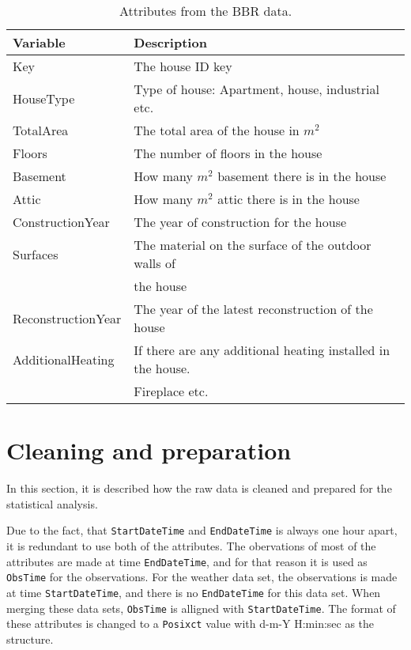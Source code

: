 \begin{table}[h]
    \centering
    \begin{tabular}{ll}
     \hline
     \textbf{Variable} & \textbf{Description} \\
    \hline
    \hline
    Key  &  The house ID key\\
    HouseType  &  Type of house: Apartment, house, industrial etc. \\
    TotalArea  & The total area of the house in $m^2$ \\
    Floors  & The number of floors in the house \\
    Basement  & How many $m^2$ basement there is in the house \\
    Attic  & How many $m^2$ attic there is in the house \\
    ConstructionYear  & The year of construction for the house  \\
    Surfaces  & The material on the surface of the outdoor walls of \\ & the house \\
    ReconstructionYear  & The year of the latest reconstruction of the house \\
    AdditionalHeating  & If there are any additional heating installed in the house. \\ & Fireplace etc. \\
    \hline
    \end{tabular}
    \caption{Attributes from the BBR data.}
    \label{tab: BBR}
\end{table}

\section{Cleaning and preparation}
In this section, it is described how the raw data is cleaned and prepared for the statistical analysis.

\noindent Due to the fact, that \texttt{StartDateTime} and \texttt{EndDateTime} is always one hour apart, it is redundant to use both of the attributes. The obervations of most of the attributes are made at time \texttt{EndDateTime}, and for that reason it is used as \texttt{ObsTime} for the observations. For the weather data set, the observations is made at time \texttt{StartDateTime}, and there is no \texttt{EndDateTime} for this data set. When merging these data sets, \texttt{ObsTime} is alligned with \texttt{StartDateTime}. The format of these attributes is changed to a \texttt{Posixct} value with d-m-Y H:min:sec as the structure.

